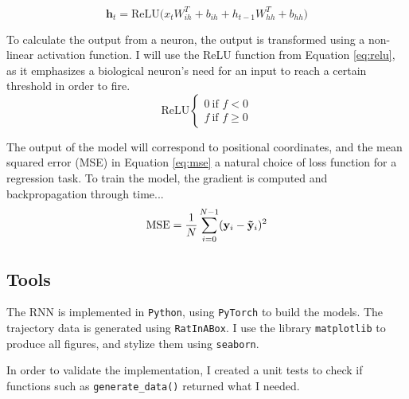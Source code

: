 \begin{equation}\label{eq:pytorch_rnn}
    \mathbf{h}_{t} = \text{ReLU} \bigg( x_{t} W_{ih}^{T} + b_{ih} + h_{t-1}W_{hh}^{T} +  b_{hh} \bigg)
\end{equation}

To calculate the output from a neuron, the output is transformed using a non-linear activation function. I will use the ReLU function from Equation \eqref{eq:relu}, as it emphasizes a biological neuron's need for an input to reach a certain threshold in order to fire. 
\begin{equation}\label{eq:relu}
    \text{ReLU} 
    \begin{cases}
        0 \ \text{if $f < 0$} \\
        f \ \text{if $f \geq 0$}
    \end{cases}
\end{equation}

The output of the model will correspond to positional coordinates, and the mean squared error (MSE) in Equation \eqref{eq:mse} a natural choice of loss function for a regression task. To train the model, the gradient is computed and backpropagation through time...
\begin{equation}\label{eq:mse}
    \text{MSE} = \frac{1}{N} \sum_{i=0}^{N-1} (\mathbf{y}_{i} - \mathbf{\Tilde{y}}_{i})^{2}
\end{equation}


\subsection{Tools}\label{sssec:tools}
The RNN is implemented in \verb|Python|, using \verb|PyTorch| to build the models. The trajectory data is generated using \verb|RatInABox|. I use the library \verb|matplotlib| to produce all figures, and stylize them using \verb|seaborn|.

In order to validate the implementation, I created a unit tests to check if functions such as \verb|generate_data()| returned what I needed.